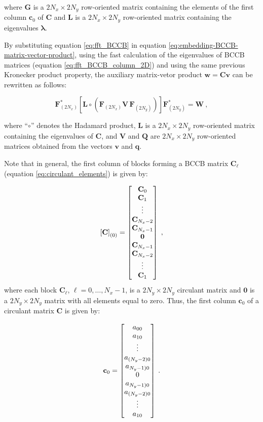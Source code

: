 \documentclass[manuscript,revised]{geophysics}
\begin{document}
\noindent where $\mathbf{G}$ is a $2N_x \times 2N_y$ row-oriented matrix containing the elements of the first column $\mathbf{c}_{0}$ of $\mathbf{C}$ and $\mathbf{L}$ is a $2N_x \times 2N_y$ row-oriented matrix containing the eigenvalues $\mathbf{\lambda}$.

By substituting equation \ref{eq:fft_BCCB} in equation \ref{eq:embedding-BCCB-matrix-vector-product}, using the fast calculation of the eigenvalues of BCCB matrices (equation \ref{eq:fft_BCCB_column_2D}) and using the same previous Kronecker product property, the auxiliary matrix-vetor product $\mathbf{w} = \mathbf{C} \mathbf{v}$ can be rewritten as follows:

\begin{equation}
\mathbf{F}_{(2 N_x)}^{\ast} \left[ \mathbf{L} \circ \left( \mathbf{F}_{(2N_x)} \mathbf{V} \, \mathbf{F}_{(2N_y)} \right) \right] \mathbf{F}_{(2N_y)}^{\ast} = \mathbf{W} \: ,
\label{eq:fft_q}
\end{equation}

\noindent where ``$\circ$'' denotes the Hadamard product, $\mathbf{L}$ is a $2N_x \times 2N_y$ row-oriented matrix containing the eigenvalues of $\mathbf{C}$, and $\mathbf{V}$ and $\mathbf{Q}$ are $2N_x \times 2N_y$ row-oriented matrices obtained from the vectors $\mathbf{v}$ and $\mathbf{q}$.

Note that in general, the first column of blocks forming a BCCB matrix $\mathbf{C}_{\ell}$ (equation \ref{eq:circulant_elements}) is given by:

\begin{equation}
\left[\mathbf{C} \right]_{(0)} = 
\begin{bmatrix}
\mathbf{C}_{0} \cr
\mathbf{C}_{1} \cr
\vdots \cr
\mathbf{C}_{N_x-2} \cr
\mathbf{C}_{N_x-1} \cr
\mathbf{0} \cr
\mathbf{C}_{N_x-1} \cr
\mathbf{C}_{N_x-2} \cr
\vdots \cr
\mathbf{C}_{1}
\end{bmatrix} \; ,
\end{equation}
where each block $\mathbf{C}_{\ell}$, $\ell = 0, \dots, N_x-1$, is a $2N_y \times 2N_y$ circulant matrix and $\mathbf{0}$ is a $2N_y \times 2N_y$ matrix with all elements equal to zero. Thus, the first column $\mathbf{c}_{0}$ of a circulant matrix $\mathbf{C}$ is given by:

\begin{equation}
\mathbf{c}_{0} =
\begin{bmatrix}
	a_{00} \cr
	a_{10} \cr
	\vdots \cr
	a_{(N_y-2)0} \cr
	a_{N_y-1) 0} \cr
	0 \cr
	a_{N_y-1) 0} \cr
	a_{(N_y-2)0} \cr
	\vdots \cr
	a_{10}
\end{bmatrix} \:.
\end{equation}
\end{document}

